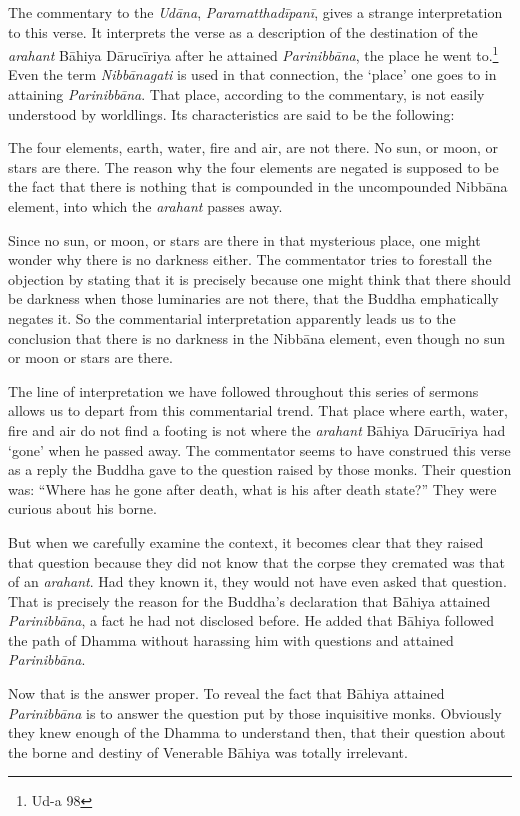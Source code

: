 The commentary to the \emph{Udāna}, \emph{Paramatthadīpanī}, gives a strange interpretation to this verse. It interprets the verse as a description of the destination of the \emph{arahant} Bāhiya Dārucīriya after he attained \emph{Parinibbāna}, the place he went to.\footnote{Ud-a 98} Even the term \emph{Nibbānagati} is used in that connection, the `place' one goes to in attaining \emph{Parinibbāna}. That place, according to the commentary, is not easily understood by worldlings. Its characteristics are said to be the following:

The four elements, earth, water, fire and air, are not there. No sun, or moon, or stars are there. The reason why the four elements are negated is supposed to be the fact that there is nothing that is compounded in the uncompounded Nibbāna element, into which the \emph{arahant} passes away.

Since no sun, or moon, or stars are there in that mysterious place, one might wonder why there is no darkness either. The commentator tries to forestall the objection by stating that it is precisely because one might think that there should be darkness when those luminaries are not there, that the Buddha emphatically negates it. So the commentarial interpretation apparently leads us to the conclusion that there is no darkness in the Nibbāna element, even though no sun or moon or stars are there.

The line of interpretation we have followed throughout this series of sermons allows us to depart from this commentarial trend. That place where earth, water, fire and air do not find a footing is not where the \emph{arahant} Bāhiya Dārucīriya had `gone' when he passed away. The commentator seems to have construed this verse as a reply the Buddha gave to the question raised by those monks. Their question was: ``Where has he gone after death, what is his after death state?'' They were curious about his borne.

But when we carefully examine the context, it becomes clear that they raised that question because they did not know that the corpse they cremated was that of an \emph{arahant}. Had they known it, they would not have even asked that question. That is precisely the reason for the Buddha's declaration that Bāhiya attained \emph{Parinibbāna}, a fact he had not disclosed before. He added that Bāhiya followed the path of Dhamma without harassing him with questions and attained \emph{Parinibbāna}.

Now that is the answer proper. To reveal the fact that Bāhiya attained \emph{Parinibbāna} is to answer the question put by those inquisitive monks. Obviously they knew enough of the Dhamma to understand then, that their question about the borne and destiny of Venerable Bāhiya was totally irrelevant.

